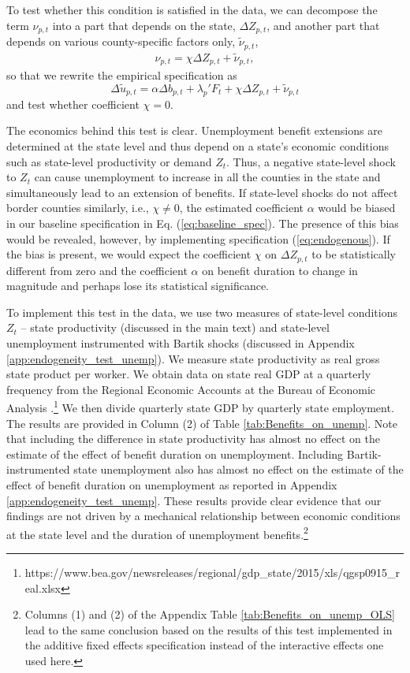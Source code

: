 \documentclass[12pt]{article}
\newcommand{\1}{\mathbf{1}}
\newcommand{\beq}{\begin{eqnarray}}
\newcommand{\eeq}{\end{eqnarray}}
\begin{document}
To test whether this condition is satisfied in the data, we can decompose the term $\nu_{p,t}$ into a part that depends on the state, $\Delta Z_{p,t}$, and another part that depends on various county-specific factors only, $\tilde{\nu}_{p,t}$,
\beq
\nu_{p,t} = \chi \Delta Z_{p,t} + \tilde{\nu}_{p,t},
\eeq
so that we rewrite the empirical specification as
\begin{equation} \label{eq:endogenous}
\Delta \tilde{u}_{p,t} =  \alpha \Delta b_{p,t} +\lambda_{p}'F_{t}+ \chi \Delta Z_{p,t} + \tilde{\nu}_{p,t}
\end{equation}
and test whether coefficient $\chi=0$.

The economics behind this test is clear. Unemployment benefit extensions are determined at the state level and thus depend on a state's economic conditions such as state-level productivity or demand $Z_t$. Thus, a negative state-level shock to $Z_t$ can cause unemployment to increase in all the counties in the state and simultaneously lead to an extension of benefits. If state-level shocks do not affect border counties similarly, i.e., $\chi \not= 0$, the estimated coefficient $\alpha$ would be biased in our baseline specification in Eq. (\ref{eq:baseline_spec}).  The presence of this bias would be revealed, however, by implementing specification (\ref{eq:endogenous}). If the bias is present, we would expect the coefficient $\chi$ on $\Delta Z_{p,t}$ to be statistically different from zero and the coefficient $\alpha$ on benefit duration to change in magnitude and perhaps lose its statistical significance.


To implement this test in the data, we use two measures of state-level conditions $Z_t$ -- state productivity (discussed in the main text) and state-level unemployment instrumented with Bartik shocks (discussed in Appendix \ref{app:endogeneity_test_unemp}). We measure state productivity as real gross state product per worker.  We obtain data on state real GDP at a quarterly frequency from the Regional Economic Accounts at the Bureau of Economic Analysis \citep{data:bea-gdp-state}.\footnote{https://www.bea.gov/newsreleases/regional/gdp\_state/2015/xls/qgsp0915\_real.xlsx} We then divide quarterly state GDP by quarterly state employment. The results are provided in Column (2) of Table \ref{tab:Benefits_on_unemp}. Note that including the difference in state productivity has almost no effect on the estimate of the effect of benefit duration on unemployment. Including Bartik-instrumented state unemployment also has almost no effect on the estimate of the effect of benefit duration on unemployment as reported in Appendix \ref{app:endogeneity_test_unemp}. These results provide clear evidence that our findings are not driven by a mechanical relationship between economic conditions at the state level and the duration of unemployment benefits.\footnote{Columns (1) and (2) of the Appendix Table \ref{tab:Benefits_on_unemp_OLS} lead to the same conclusion based on the results of this test implemented in the additive fixed effects specification instead of the interactive effects one used here.}
\end{document}
